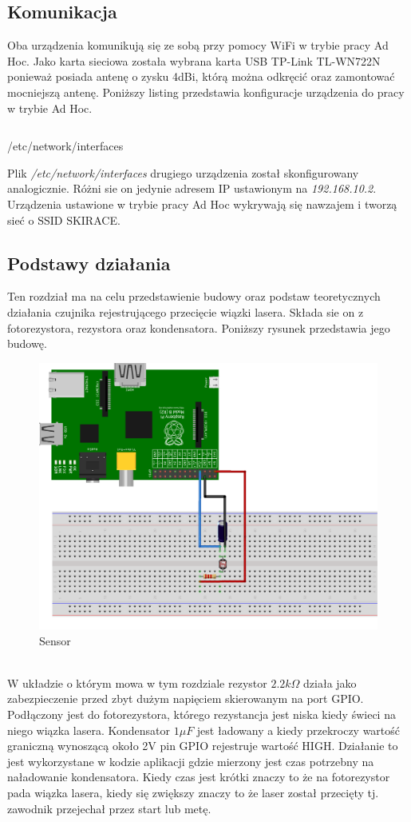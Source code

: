 \documentclass[11pt,a4paper, twoside]{article}
\begin{document}
\subsection{Komunikacja}
Oba urządzenia komunikują się ze sobą przy pomocy WiFi w trybie pracy Ad Hoc. Jako karta sieciowa została wybrana karta USB TP-Link \mbox{TL-WN722N} ponieważ posiada antenę o zysku 4dBi, którą można odkręcić oraz zamontować mocniejszą antenę. Poniższy listing przedstawia konfiguracje urządzenia do pracy w trybie Ad Hoc.
\begin{listing}[H]
\inputminted[linenos=true]{sh}{./src/adhoc}
\caption{/etc/network/interfaces}
\end{listing}
Plik \emph{/etc/network/interfaces} drugiego urządzenia został skonfigurowany analogicznie. Różni sie on jedynie adresem IP ustawionym na \emph{192.168.10.2}. Urządzenia ustawione w trybie pracy Ad Hoc wykrywają się nawzajem i tworzą sieć o SSID SKIRACE.
\newpage
\subsection{Podstawy działania}
Ten rozdział ma na celu przedstawienie budowy oraz podstaw teoretycznych działania czujnika rejestrującego przecięcie wiązki lasera. Składa sie on z fotorezystora, rezystora oraz kondensatora. Poniższy rysunek przedstawia jego budowę.
\begin{figure}[h]
\includegraphics[scale=0.15]{./img/sensor_bb.png}
\caption{Sensor}
\end{figure}
\\\noindent
W układzie o którym mowa w tym rozdziale rezystor $2.2k \Omega$ działa jako zabezpieczenie przed zbyt dużym napięciem skierowanym na port GPIO. Podłączony jest do fotorezystora, którego rezystancja jest niska kiedy świeci na niego wiązka lasera. Kondensator $1\mu F$ jest ładowany a kiedy przekroczy wartość graniczną wynoszącą około 2V pin GPIO rejestruje wartość HIGH. Działanie to jest wykorzystane w kodzie aplikacji gdzie mierzony jest czas potrzebny na naładowanie kondensatora. Kiedy czas jest krótki znaczy to że na fotorezystor pada wiązka lasera, kiedy się zwiększy znaczy to że laser został przecięty tj. zawodnik przejechał przez start lub metę.
\newpage
\end{document}
